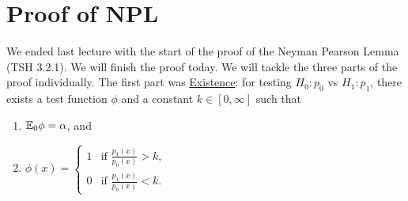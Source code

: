 \section{Proof of NPL}
We ended last lecture with the start of the proof of the Neyman Pearson Lemma (TSH 3.2.1). We will finish the proof today. We will tackle the three parts of the proof individually. The first part was \underline{Existence}: for testing $H_0 :p_0$ vs $H_1:p_1$, there exists a test function $\phi$ and a constant $k \in [0,\infty]$ such that 
\begin{enumerate}
    \item ${\mathbb{E}}_0\phi = {\alpha}$, and
    \item $\phi(x) = \begin{cases} 1 & \text{if } \frac{p_1(x)}{p_0(x)} > k,\\
     0 & \text{if } \frac{p_1(x)}{p_0(x)} < k.\end{cases}$
\end{enumerate}

